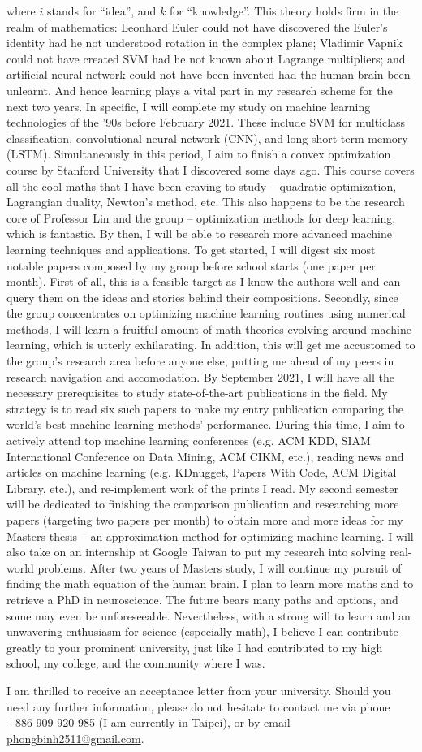 \documentclass[letterpaper,12pt]{article}
\begin{document}
where \(i\) stands for ``idea'', and \(k\) for ``knowledge''. This theory holds firm in the realm of mathematics: Leonhard Euler could not have discovered the Euler's identity had he not understood rotation in the complex plane; Vladimir Vapnik could not have created SVM had he not known about Lagrange multipliers; and artificial neural network could not have been invented had the human brain been unlearnt. And hence learning plays a vital part in my research scheme for the next two years. In specific, I will complete my study on machine learning technologies of the '90s before February 2021. These include SVM for multiclass classification, convolutional neural network (CNN), and long short-term memory (LSTM). Simultaneously in this period, I aim to finish a convex optimization course by Stanford University that I discovered some days ago. This course covers all the cool maths that I have been craving to study -- quadratic optimization, Lagrangian duality, Newton's method, etc. This also happens to be the research core of Professor Lin and the group -- optimization methods for deep learning, which is fantastic. By then, I will be able to research more advanced machine learning techniques and applications. To get started, I will digest six most notable papers composed by my group before school starts (one paper per month). First of all, this is a feasible target as I know the authors well and can query them on the ideas and stories behind their compositions. Secondly, since the group concentrates on optimizing machine learning routines using numerical methods, I will learn a fruitful amount of math theories evolving around machine learning, which is utterly exhilarating. In addition, this will get me accustomed to the group's research area before anyone else, putting me ahead of my peers in research navigation and accomodation. By September 2021, I will have all the necessary prerequisites to study state-of-the-art publications in the field. My strategy is to read six such papers to make my entry publication comparing the world's best machine learning methods' performance. During this time, I aim to actively attend top machine learning conferences (e.g. ACM KDD, SIAM International Conference on Data Mining, ACM CIKM, etc.), reading news and articles on machine learning (e.g. KDnugget, Papers With Code, ACM Digital Library, etc.), and re-implement work of the prints I read. My second semester will be dedicated to finishing the comparison publication and researching more papers (targeting two papers per month) to obtain more and more ideas for my Masters thesis -- an approximation method for optimizing machine learning. I will also take on an internship at Google Taiwan to put my research into solving real-world problems. After two years of Masters study, I will continue my pursuit of finding the math equation of the human brain. I plan to learn more maths and to retrieve a PhD in neuroscience. The future bears many paths and options, and some may even be unforeseeable. Nevertheless, with a strong will to learn and an unwavering enthusiasm for science (especially math), I believe I can contribute greatly to your prominent university, just like I had contributed to my high school, my college, and the community where I was.

I am thrilled to receive an acceptance letter from your university. Should you need any further information, please do not hesitate to contact me via phone +886-909-920-985 (I am currently in Taipei), or by email \href{mailto:phongbinh2511@gmail.com}{phongbinh2511@gmail.com}.
\end{document}
